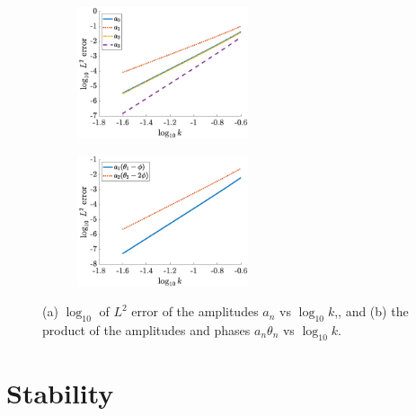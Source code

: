 \documentclass[11pt,reqno]{amsart}
\begin{document}
\begin{figure}
    \centering
    \begin{subfigure}{0.4\linewidth}
        \caption{}
        \label{fig:m6errora}
        \includegraphics[width=5cm]{N6aerror.eps}
    \end{subfigure}
    \begin{subfigure}{0.4\linewidth}
        \caption{}
        \label{fig:m6errorb}
        \includegraphics[width=5cm]{N6athetaerror.eps}
    \end{subfigure}
    \caption{(a) $\log_{10}$ of $L^2$ error of the amplitudes $a_n$ vs $\log_{10} k$,, and (b) the product of the amplitudes and phases $a_n \theta_n $ vs $\log_{10} k$.}
    \label{fig:m6error}
\end{figure}

\section{Stability}\label{sec:stability}
\end{document}
